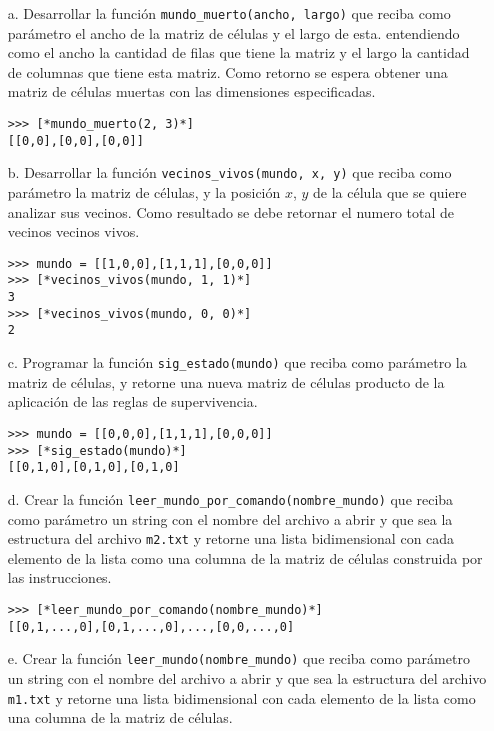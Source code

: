 \begin{itemize}
\item[a.] Desarrollar la función \texttt{mundo\_muerto(ancho, largo)} que reciba como parámetro el ancho de la matriz de células y el largo de esta. entendiendo como el ancho la cantidad de filas que tiene la matriz y el largo la cantidad de columnas que tiene esta matriz. Como retorno se espera obtener una matriz de células muertas con las dimensiones especificadas.

\begin{lstlisting}[style=consola]
>>> [*mundo_muerto(2, 3)*]
[[0,0],[0,0],[0,0]]
\end{lstlisting}

\item[b.] Desarrollar la función \texttt{vecinos\_vivos(mundo, x, y)} que reciba como parámetro la matriz de células, y la posición $x$, $y$ de la célula que se quiere analizar sus vecinos. Como resultado se debe retornar el numero total de vecinos vecinos vivos.
\begin{lstlisting}[style=consola]
>>> mundo = [[1,0,0],[1,1,1],[0,0,0]]
>>> [*vecinos_vivos(mundo, 1, 1)*]
3
>>> [*vecinos_vivos(mundo, 0, 0)*]
2
\end{lstlisting}

\item[c.] Programar la función \texttt{sig\_estado(mundo)} que reciba como parámetro la matriz de células, y retorne una nueva matriz de células producto de la aplicación de las reglas de supervivencia.
\begin{lstlisting}[style=consola]
>>> mundo = [[0,0,0],[1,1,1],[0,0,0]]
>>> [*sig_estado(mundo)*]
[[0,1,0],[0,1,0],[0,1,0]
\end{lstlisting}

\item[d.] Crear la función \texttt{leer\_mundo\_por\_comando(nombre\_mundo)} que reciba como parámetro un string con el nombre del archivo a abrir y que sea la estructura del archivo \texttt{m2.txt} y retorne una lista bidimensional con cada elemento de la lista como una columna de la matriz de células construida por las instrucciones.

\begin{lstlisting}[style=consola]
>>> [*leer_mundo_por_comando(nombre_mundo)*]
[[0,1,...,0],[0,1,...,0],...,[0,0,...,0]
\end{lstlisting}

\item[e.] Crear la función \texttt{leer\_mundo(nombre\_mundo)} que reciba como parámetro un string con el nombre del archivo a abrir y que sea la estructura del archivo \texttt{m1.txt} y retorne una lista bidimensional con cada elemento de la lista como una columna de la matriz de células.


\end{itemize}
